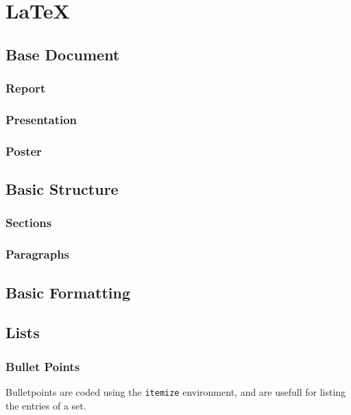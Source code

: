\chapter{\LaTeX}
\label{latex}

\section{Base Document}

\subsection{Report}
\subsection{Presentation}
\subsection{Poster}

\section{Basic Structure}
\subsection{Sections}
\subsection{Paragraphs}

\section{Basic Formatting}

\section{Lists}
\subsection{Bullet Points}

Bulletpoints are coded using the \texttt{itemize} environment, and are usefull for listing the entries of a set.

